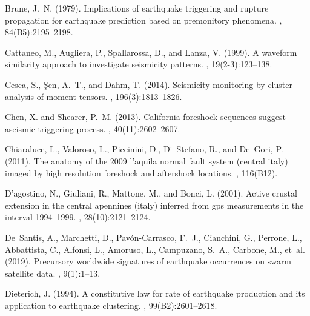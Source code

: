 \documentclass[a4paper,12pt,twoside]{article}
\begin{document}
\begin{thebibliography}{}
Brune, J.~N. (1979).
\newblock Implications of earthquake triggering and rupture propagation for
  earthquake prediction based on premonitory phenomena.
,
  84(B5):2195--2198.

Cattaneo, M., Augliera, P., Spallarossa, D., and Lanza, V. (1999).
\newblock A waveform similarity approach to investigate seismicity patterns.
, 19(2-3):123--138.

Cesca, S., {\c{S}}en, A.~T., and Dahm, T. (2014).
\newblock Seismicity monitoring by cluster analysis of moment tensors.
, 196(3):1813--1826.

Chen, X. and Shearer, P.~M. (2013).
\newblock California foreshock sequences suggest aseismic triggering process.
, 40(11):2602--2607.

Chiaraluce, L., Valoroso, L., Piccinini, D., Di~Stefano, R., and De~Gori, P.
  (2011).
\newblock The anatomy of the 2009 l'aquila normal fault system (central italy)
  imaged by high resolution foreshock and aftershock locations.
, 116(B12).

D'agostino, N., Giuliani, R., Mattone, M., and Bonci, L. (2001).
\newblock Active crustal extension in the central apennines (italy) inferred
  from gps measurements in the interval 1994--1999.
, 28(10):2121--2124.

De~Santis, A., Marchetti, D., Pav\'on-Carrasco, F.~J., Cianchini, G.,
  Perrone, L., Abbattista, C., Alfonsi, L., Amoruso, L., Campuzano, S.~A.,
  Carbone, M., et~al. (2019).
\newblock Precursory worldwide signatures of earthquake occurrences on swarm
  satellite data.
, 9(1):1--13.

Dieterich, J. (1994).
\newblock A constitutive law for rate of earthquake production and its
  application to earthquake clustering.
,
  99(B2):2601--2618.


\end{thebibliography}
\end{document}
